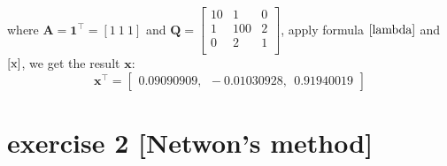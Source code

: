 \documentclass[11pt]{article}
\begin{document}
where $\textbf{A} = \textbf{1}^{\top} = [1 \  1 \  1]$ and $\textbf{Q} =  \begin{bmatrix}
10 & 1 & 0\\
1& 100 & 2\\
0 & 2 & 1 \\
\end{bmatrix}$, apply formula $\ref{lambda}$ and $\ref{x}$, we get the result $\textbf{x}$:
\begin{equation}
\textbf{x}^{\top} = \left[ \begin{array}{ccc}   0.09090909,\ \ -0.01030928, \ \ 0.91940019  \end{array} \right] \nonumber
\end{equation}

\section{exercise 2 [Netwon’s method]}
\end{document}
